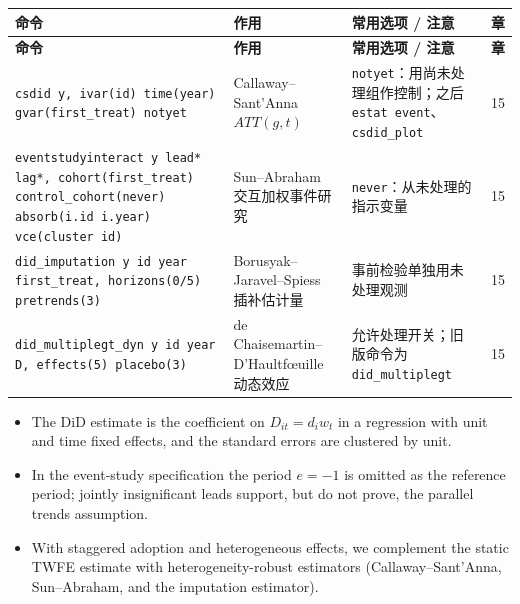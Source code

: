 {\renewcommand{\arraystretch}{1.12}\begin{longtable}{@{}>{\raggedright\arraybackslash\small}p{5.3cm}>{\raggedright\arraybackslash\small}p{3.8cm}>{\raggedright\arraybackslash\small}p{5.3cm}>{\centering\arraybackslash\small}p{0.9cm}@{}}
\toprule
\textbf{命令} & \textbf{作用} & \textbf{常用选项 / 注意} & \textbf{章}\\
\midrule
\endfirsthead
\toprule
\textbf{命令} & \textbf{作用} & \textbf{常用选项 / 注意} & \textbf{章}\\
\midrule
\endhead
\bottomrule
\endlastfoot

\texttt{csdid y, ivar(id) time(year) gvar(first\_treat) notyet}\newline {\footnotesize\rmfamily [SSC]} & Callaway–Sant'Anna $ATT(g,t)$ & \texttt{notyet}：用尚未处理组作控制；之后 \texttt{estat event}、\texttt{csdid\_plot} & 15\\
\addlinespace[1pt]
\texttt{eventstudyinteract y lead* lag*, cohort(first\_treat) control\_cohort(never) absorb(i.id i.year) vce(cluster id)}\newline {\footnotesize\rmfamily [SSC]} & Sun–Abraham 交互加权事件研究 & \texttt{never}：从未处理的指示变量 & 15\\
\addlinespace[1pt]
\texttt{did\_imputation y id year first\_treat, horizons(0/5) pretrends(3)}\newline {\footnotesize\rmfamily [SSC]} & Borusyak–Jaravel–Spiess 插补估计量 & 事前检验单独用未处理观测 & 15\\
\addlinespace[1pt]
\texttt{did\_multiplegt\_dyn y id year D, effects(5) placebo(3)}\newline {\footnotesize\rmfamily [SSC]} & de Chaisemartin–D'Haultf\oe uille 动态效应 & 允许处理开关；旧版命令为 \texttt{did\_multiplegt} & 15\\
\end{longtable}}


\begin{english}
\begin{itemize}
  \item The DiD estimate is the coefficient on $D_{it}=d_iw_t$ in a regression with unit and time fixed effects, and the standard errors are clustered by unit.
  \item In the event-study specification the period $e=-1$ is omitted as the reference period; jointly insignificant leads support, but do not prove, the parallel trends assumption.
  \item With staggered adoption and heterogeneous effects, we complement the static TWFE estimate with heterogeneity-robust estimators (Callaway--Sant'Anna, Sun--Abraham, and the imputation estimator).
\end{itemize}
\end{english}


